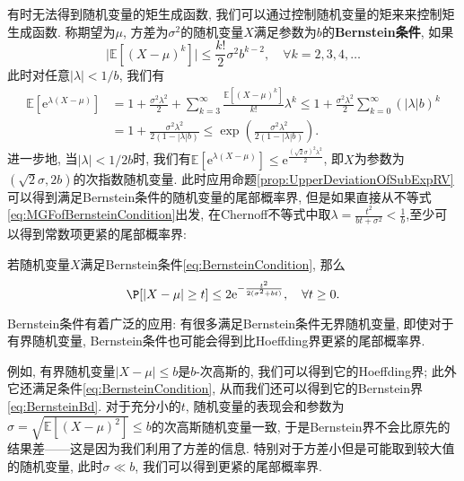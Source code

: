 有时无法得到随机变量的矩生成函数, 我们可以通过控制随机变量的矩来来控制矩生成函数.   
称期望为$\mu$, 方差为$\sigma^2$的随机变量$X$满足参数为$b$的\textbf{Bernstein条件}, 如果
\begin{equation}\label{eq:BernsteinCondition}
	\bigg|\mathbb{E}\left[(X - \mu)^k\right]\bigg|
	\leq \frac{k!}{2} \sigma^2 b^{k-2}, \quad \forall k = 2,3,4, \dots
\end{equation}
此时对任意$|\lambda| < 1/b$, 我们有
\begin{equation}\label{eq:MGFofBernsteinCondition}
	\begin{aligned}
	\mathbb{E}[\mathrm{e}^{\lambda(X-\mu)}]
	&= 1 + \frac{\sigma^2 \lambda^2}{2} + \sum_{k=3}^{\infty} \frac{\mathbb{E}[(X-\mu)^k]}{k!} \lambda^k  
	\leq 1 + \frac{\sigma^2 \lambda^2}{2} \sum_{k=0}^{\infty} (|\lambda| b)^k \\
	&= 1 + \frac{\sigma^2 \lambda^2}{2(1 - |\lambda| b)}
	\leq \exp \left( \frac{\sigma^2 \lambda^2}{2(1 - |\lambda| b)} \right).
	\end{aligned}
\end{equation}
进一步地, 当$|\lambda| < 1/2b$时, 我们有$\mathbb{E}[\mathrm{e}^{\lambda(X-\mu)}] \leq \mathrm{e}^{\frac{(\sqrt{2} \sigma)^2 \lambda^2}{2}}$, 即$X$为参数为$(\sqrt{2} \sigma, 2b)$的次指数随机变量. 
此时应用命题\ref{prop:UpperDeviationOfSubExpRV}可以得到满足Bernstein条件的随机变量的尾部概率界, 但是如果直接从不等式\eqref{eq:MGFofBernsteinCondition}出发, 在Chernoff不等式中取$\lambda = \frac{t^2}{bt + \sigma^2} < \frac{1}{b}$,至少可以得到常数项更紧的尾部概率界: 
\begin{proposition}[Bernstein界]
	若随机变量$X$满足Bernstein条件\eqref{eq:BernsteinCondition}, 那么
	\begin{equation}\label{eq:BernsteinBd}
		\P[|X-\mu| \geq t] \leq 2 \mathrm{e}^{-\frac{t^2}{2(\sigma^2 + bt)}}, \quad \forall t \geq 0. 
	\end{equation}
\end{proposition}
\begin{remark}\label{rm:UsingDistributionMethod}
	Bernstein条件有着广泛的应用: 有很多满足Bernstein条件无界随机变量, 即使对于有界随机变量, Bernstein条件也可能会得到比Hoeffding界更紧的尾部概率界.  
	
	例如, 有界随机变量$|X - \mu| \leq b$是$b$-次高斯的, 我们可以得到它的Hoeffding界; 此外它还满足条件\eqref{eq:BernsteinCondition}, 从而我们还可以得到它的Bernstein界\eqref{eq:BernsteinBd}. 
	对于充分小的$t$, 随机变量的表现会和参数为$\sigma = \sqrt{\mathbb{E}[(X-\mu)^2]} \leq b$的次高斯随机变量一致, 于是Bernstein界不会比原先的结果差——这是因为我们利用了方差的信息. 
	特别对于方差小但是可能取到较大值的随机变量, 此时$\sigma \ll b$, 我们可以得到更紧的尾部概率界. 
\end{remark}


